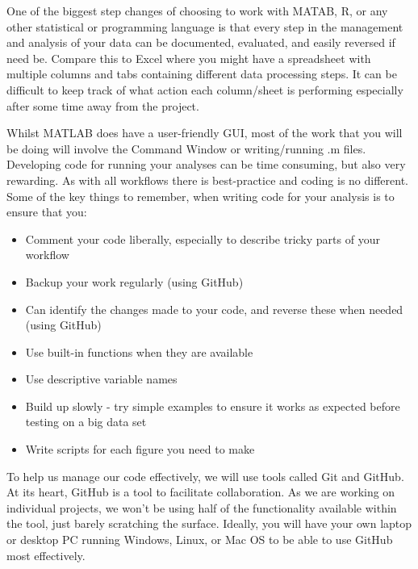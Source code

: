 \documentclass[11pt,onecolumn,a4paper,notitlepage]{article}
\begin{document}
One of the biggest step changes of choosing to work with MATAB, R, or any other statistical or programming language is that every step in the management and analysis of your data can be documented, evaluated, and easily reversed if need be. Compare this to Excel where you might have a spreadsheet with multiple columns and tabs containing different data processing steps. It can be difficult to keep track of what action each column/sheet is performing especially after some time away from the project.

Whilst MATLAB does have a user-friendly GUI, most of the work that you will be doing will involve the Command Window or writing/running .m files. Developing code for running your analyses can be time consuming, but also very rewarding. As with all workflows there is best-practice and coding is no different. Some of the key things to remember, when writing code for your analysis is to ensure that you:
       
\begin{itemize}
\item Comment your code liberally, especially to describe tricky parts of your workflow
\item Backup your work regularly (using GitHub)
\item Can identify the changes made to your code, and reverse these when needed (using GitHub)
\item Use built-in functions when they are available
\item Use descriptive variable names
\item Build up slowly - try simple examples to ensure it works as expected before testing on a big data set
\item Write scripts for each figure you need to make
\end{itemize}

To help us manage our code effectively, we will use tools called Git and GitHub. At its heart, GitHub is a tool to facilitate collaboration. As we are working on individual projects, we won't be using half of the functionality available within the tool, just barely scratching the surface. Ideally, you will have your own laptop or desktop PC running Windows, Linux, or Mac OS to be able to use GitHub most effectively. 
\end{document}
